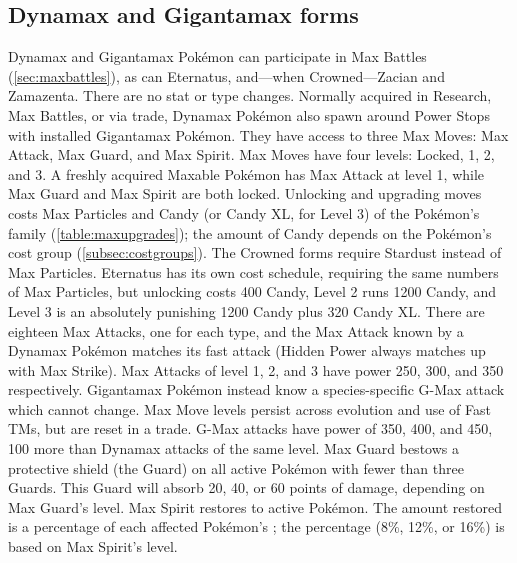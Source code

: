 \subsection{Dynamax and Gigantamax forms\label{sec:dmaxgmax}}
Dynamax and Gigantamax Pokémon can participate in Max Battles (\autoref{sec:maxbattles}),
 as can Eternatus, and---when Crowned---Zacian and Zamazenta.
There are no stat or type changes.
Normally acquired in Research, Max Battles, or via trade,
 Dynamax Pokémon also spawn around Power Stops with installed Gigantamax Pokémon.
They have access to three Max Moves: Max Attack, Max Guard, and Max Spirit.
Max Moves have four levels: Locked, 1, 2, and 3.
A freshly acquired Maxable Pokémon has Max Attack at level 1, while Max Guard and Max Spirit are both locked.
Unlocking and upgrading moves costs Max Particles and Candy (or Candy XL, for Level 3) of the Pokémon's family (\autoref{table:maxupgrades});
 the amount of Candy depends on the Pokémon's cost group (\autoref{subsec:costgroups}).
The Crowned forms require Stardust instead of Max Particles.
Eternatus has its own cost schedule, requiring the same numbers of Max Particles,
 but unlocking costs 400 Candy, Level 2 runs 1200 Candy, and
 Level 3 is an absolutely punishing 1200 Candy plus 320 Candy XL.
There are eighteen Max Attacks, one for each type, and the Max Attack known by a Dynamax Pokémon matches its fast attack
 (Hidden Power always matches up with Max Strike).
Max Attacks of level 1, 2, and 3 have power 250, 300, and 350 respectively.
Gigantamax Pokémon instead know a species-specific G-Max attack which cannot change.
Max Move levels persist across evolution and use of Fast TMs, but are reset in a trade.
G-Max attacks have power of 350, 400, and 450, 100 more than Dynamax attacks of the same level.
Max Guard bestows a protective shield (the Guard) on all active Pokémon
  with fewer than three Guards.
This Guard will absorb 20, 40, or 60 points of damage, depending on Max Guard's level.
Max Spirit restores \HP{} to active Pokémon.
The amount restored is a percentage of each affected Pokémon's \MHP\@;
  the percentage (8\%, 12\%, or 16\%) is based on Max Spirit's level.

